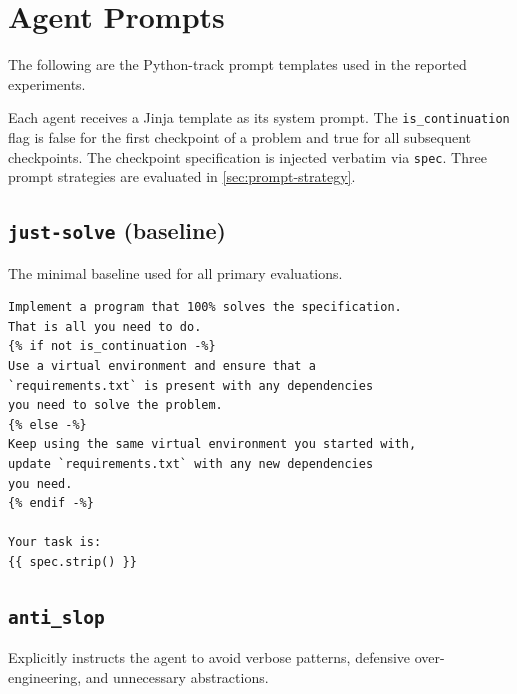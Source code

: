 \section{Agent Prompts}\label{sec:prompts}
The following are the Python-track prompt templates used in the reported experiments.

Each agent receives a Jinja template as its system prompt. The \texttt{is\_continuation} flag is false for the first checkpoint of a problem and true for all subsequent checkpoints. The checkpoint specification is injected verbatim via \texttt{spec}. Three prompt strategies are evaluated in \autoref{sec:prompt-strategy}.

\subsection{\texttt{just-solve} (baseline)}

The minimal baseline used for all primary evaluations.

\begin{lstlisting}[style=specblock, caption={\texttt{just-solve} prompt template}, label={lst:just-solve-prompt}]
Implement a program that 100% solves the specification.
That is all you need to do.
{% if not is_continuation -%}
Use a virtual environment and ensure that a
`requirements.txt` is present with any dependencies
you need to solve the problem.
{% else -%}
Keep using the same virtual environment you started with,
update `requirements.txt` with any new dependencies
you need.
{% endif -%}

Your task is:
{{ spec.strip() }}
\end{lstlisting}

\subsection{\texttt{anti\_slop}}

Explicitly instructs the agent to avoid verbose patterns, defensive over-engineering, and unnecessary abstractions.

